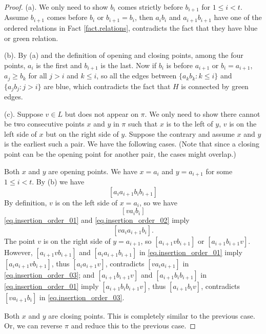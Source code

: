 \documentclass[12pt]{article}
\begin{document}
\begin{proof} 
(a). We only need to show $b_i$ comes strictly before $b_{i+1}$
for $1 \le i < t$. Assume $b_{i+1}$ comes before $b_i$ or $b_{i+1} = b_i$,
then $a_ib_i$ and $a_{i+1}b_{i+1}$ have one of the ordered relations in
Fact \ref{fact.relations}, contradicts the fact that they have blue or green relation.

(b). By (a) and the definition of opening and closing points, 
among the four points, 
$a_i$ is the first and $b_{i+1}$ is the last.
Now if $b_i$ is before $a_{i+1}$ or $b_i=a_{i+1}$,
$a_j \ge b_k$ for all $j>i$ and $k \le i$,
so all the edges between $\{a_kb_k: k \le i\}$ and $\{a_jb_j: j > i\}$
are blue, which contradicts the fact that $H$ is connected by green edges.

(c). Suppose $v \in L$ but does not appear on $\pi$. 
We only need to show there cannot be two consecutive points $x$ and $y$ in $\pi$
such that $x$ is to the left of $y$, $v$ is on the left side of $x$ but on the right side of $y$.
Suppose the contrary and assume $x$ and $y$ is the earliest such a pair. We have the following cases. (Note that since a closing point can be the opening point for another pair, the cases might
overlap.)

 Both $x$ and $y$ are opening points. 
We have $x = a_i$ and $y = a_{i+1}$ for some $1 \le i < t$.
By (b) we have 
\begin{equation}\label{eq.insertion_order_01}
[a_i a_{i+1} b_i b_{i+1}]
\end{equation}
By definition, $v$ is on the left side of $x = a_i$, so we have
\begin{equation}\label{eq.insertion_order_02}
[v a_i b_i]
\end{equation}
\eqref{eq.insertion_order_01} and \eqref{eq.insertion_order_02}
imply
\begin{equation}\label{eq.insertion_order_03}
[v a_i a_{i+1} b_i].
\end{equation}
The point $v$ is on the right side of $y = a_{i+1}$,
so $[a_{i+1}vb_{i+1}]$ or $[a_{i+1}b_{i+1}v]$.
However, $[a_{i+1}vb_{i+1}]$ and $[a_{i}a_{i+1}b_{i+1}]$ in \eqref{eq.insertion_order_01}
imply $[a_{i}a_{i+1} v b_{i+1}]$, thus $[a_{i}a_{i+1} v]$, contradicts
$[va_ia_{i+1}]$ in \eqref{eq.insertion_order_03};
and $[a_{i+1}b_{i+1}v]$ and $[a_{i+1} b_i b_{i+1}]$
in \eqref{eq.insertion_order_01} imply $[a_{i+1}b_ib_{i+1}v]$,
thus $[a_{i+1}b_iv]$, contradicts $[va_{i+1}b_i]$ in
\eqref{eq.insertion_order_03}.

 Both $x$ and $y$ are closing points.
This is completely similar to the previous case.
Or, we can reverse $\pi$ and reduce this to the previous case.


\end{proof}
\end{document}
